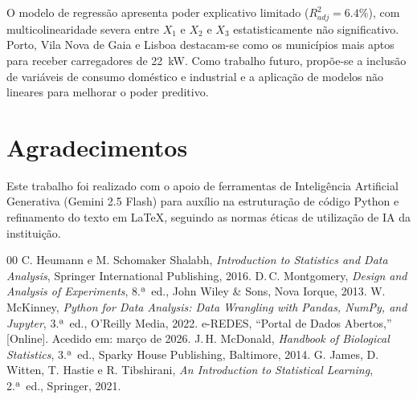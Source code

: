 \documentclass[conference]{IEEEtran}
\begin{document}
O modelo de regressão apresenta poder explicativo limitado ($R^2_{adj} = 6.4\%$), com multicolinearidade severa entre $X_1$ e $X_2$ e $X_3$ estatisticamente não significativo. Porto, Vila Nova de Gaia e Lisboa destacam-se como os municípios mais aptos para receber carregadores de 22~kW. Como trabalho futuro, propõe-se a inclusão de variáveis de consumo doméstico e industrial e a aplicação de modelos não lineares para melhorar o poder preditivo.


\section*{Agradecimentos}

Este trabalho foi realizado com o apoio de ferramentas de Inteligência Artificial Generativa (Gemini 2.5 Flash) para auxílio na estruturação de código Python e refinamento do texto em \LaTeX, seguindo as normas éticas de utilização de IA da instituição.

\begin{thebibliography}{00}
 C. Heumann e M. Schomaker Shalabh, \textit{Introduction to Statistics and Data Analysis},
Springer International Publishing, 2016.
 D.\,C. Montgomery, \textit{Design and Analysis of Experiments}, 8.ª~ed.,
John Wiley \& Sons, Nova Iorque, 2013.
 W. McKinney, \textit{Python for Data Analysis: Data Wrangling with Pandas, NumPy, and Jupyter},
3.ª~ed., O'Reilly Media, 2022.
 e-REDES, ``Portal de Dados Abertos,'' [Online].
Acedido em: março de 2026.
 J.\,H. McDonald, \textit{Handbook of Biological Statistics}, 3.ª~ed.,
Sparky House Publishing, Baltimore, 2014.
 G. James, D. Witten, T. Hastie e R. Tibshirani,
\textit{An Introduction to Statistical Learning}, 2.ª~ed., Springer, 2021.
\end{thebibliography}
\end{document}
